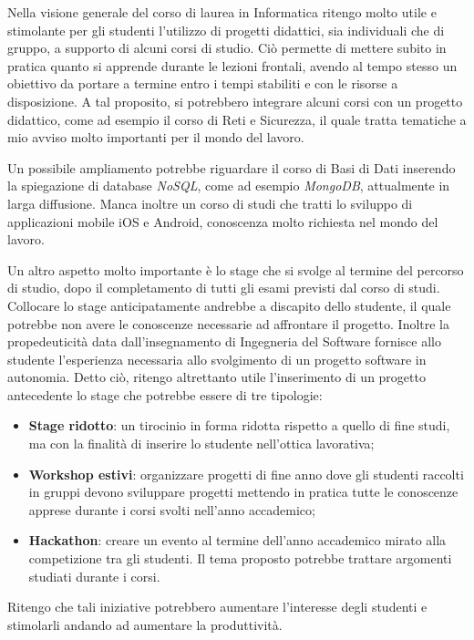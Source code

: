 Nella visione generale del corso di laurea in Informatica ritengo molto utile e stimolante per gli studenti l'utilizzo di progetti didattici, sia individuali che di gruppo, a supporto di alcuni corsi di studio. Ciò permette di mettere subito in pratica quanto si apprende durante le lezioni frontali, avendo al tempo stesso un obiettivo da portare a termine entro i tempi stabiliti e con le risorse a disposizione. A tal proposito, si potrebbero integrare alcuni corsi con un progetto didattico, come ad esempio il corso di Reti e Sicurezza, il quale tratta tematiche a mio avviso molto importanti per il mondo del lavoro.

Un possibile ampliamento potrebbe riguardare il corso di Basi di Dati inserendo la spiegazione di database \textit{NoSQL}, come ad esempio \textit{MongoDB}, attualmente in larga diffusione.
Manca inoltre un corso di studi che tratti lo sviluppo di applicazioni mobile iOS e Android, conoscenza molto richiesta nel mondo del lavoro.

\medskip

Un altro aspetto molto importante è lo stage che si svolge al termine del percorso di studio, dopo il completamento di tutti gli esami previsti dal corso di studi. Collocare lo stage anticipatamente andrebbe a discapito dello studente, il quale potrebbe non avere le conoscenze necessarie ad affrontare il progetto. Inoltre la propedeuticità data dall'insegnamento di Ingegneria del Software fornisce allo studente l'esperienza necessaria allo svolgimento di un progetto software in autonomia. Detto ciò, ritengo altrettanto utile l'inserimento di un progetto antecedente lo stage che potrebbe essere di tre tipologie:
\begin{itemize}
\item \textbf{Stage ridotto}: un tirocinio in forma ridotta rispetto a quello di fine studi, ma con la finalità di inserire lo studente nell'ottica lavorativa;
\item \textbf{Workshop estivi}: organizzare progetti di fine anno dove gli studenti raccolti in gruppi devono sviluppare progetti mettendo in pratica tutte le conoscenze apprese durante i corsi svolti nell'anno accademico;
\item \textbf{Hackathon}: creare un evento al termine dell'anno accademico mirato alla competizione tra gli studenti. Il tema proposto potrebbe trattare argomenti studiati durante i corsi.
\end{itemize}

Ritengo che tali iniziative potrebbero aumentare l'interesse degli studenti e stimolarli andando ad aumentare la produttività.